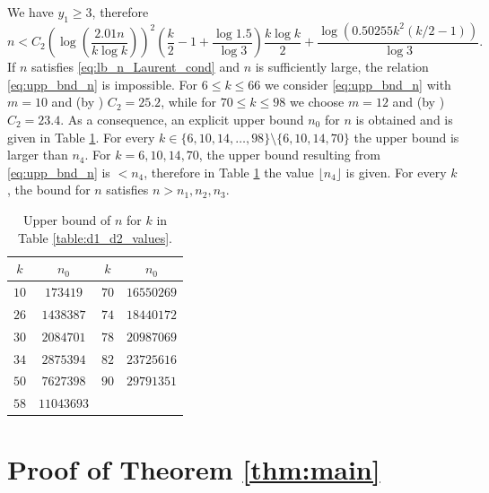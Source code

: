 \documentclass[12pt]{amsart}
\numberwithin{equation}{section}
\theoremstyle{definition}
\theoremstyle{remark}
\begin{document}
We have $y_1\ge 3$, therefore
%
\begin{equation} \label{eq:upp_bnd_n}
     n < C_2 \left(\log\left(\frac{2.01n}{k\log k}\right)\right)^2\left(\frac{k}{2}-1+\frac{\log 1.5}{\log 3}\right)\frac{k\log k}{2} + \frac{\log\left(0.50255k^2(k/2-1)\right)}{\log 3}.
\end{equation}
%
If $n$ satisfies \eqref{eq:lb_n_Laurent_cond} and $n$ is sufficiently large, the relation \eqref{eq:upp_bnd_n} is impossible. For $6\le k\le 66$ we consider \eqref{eq:upp_bnd_n} with $m=10$ and (by \cite[Table 1]{Laurent08}) $C_2=25.2$, while for $70\le k\le 98$ we choose $m=12$ and (by \cite[Table 1]{Laurent08}) $C_2=23.4$. As a consequence, an explicit upper bound $n_0$ for $n$ is obtained and is given in Table \ref{table:bound_n}. For every $k\in\{6,10,14,\ldots,98\}\setminus\{6,10,14,70\}$ the upper bound is larger than $n_4$. For $k=6,10,14,70$, the upper bound resulting from \eqref{eq:upp_bnd_n} is $<n_4$, therefore in Table \ref{table:bound_n} the value  $\lfloor n_4\rfloor$ is given. For every $k$, the bound for $n$ satisfies $n > n_1, n_2,n_3$.

\begin{table}[h]
    \centering
    \begin{tabular}{| c | c || c | c |}
    \hline
        $k$  & $n_0$ & $k$  & $n_0$
    \\ \hline  
        $10$ & $173419$ & $70$ & $16550269$ 
    \\ \hline
        $26$ & $1438387$ & $74$ & $18440172$
    \\ \hline
        $30$ & $2084701$ & $78$ & $20987069$   
    \\ \hline 
        $34$ & $2875394$ & $82$ & $23725616$ 
    \\ \hline
        
      $50$ & $7627398$ & $90$ & $29791351$
    \\ \hline  
     $58$ & $11043693$ & &
     \\ \hline    
    \end{tabular}
    \caption{Upper bound of $n$ for $k$ in Table \ref{table:d1_d2_values}.}
    \label{table:bound_n}
\end{table}


\section{Proof of Theorem \ref{thm:main}}
\end{document}
